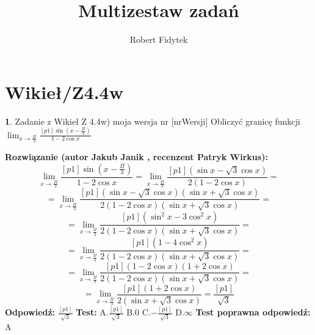 \documentclass[12pt, a4paper]{article}
\title{Multizestaw zadań}
\author{Robert Fidytek}
\date{}
\theoremstyle{definition} %
\newtheorem{zad}{}
\newcommand{\kategoria}[1]{\section{#1}} %
\newcommand{\zadStart}[1]{\begin{zad}#1\newline} %
\newcommand{\zadStop}{\end{zad}}   %
\newcommand{\rozwStart}[2]{\noindent \textbf{Rozwiązanie (autor #1 , recenzent #2): }\newline} %
\newcommand{\rozwStop}{\newline}                                            %
\newcommand{\odpStart}{\noindent \textbf{Odpowiedź:}\newline}    %
\newcommand{\odpStop}{\newline}                                             %
\newcommand{\testStart}{\noindent \textbf{Test:}\newline} %
\newcommand{\testStop}{\newline} %
\newcommand{\kluczStart}{\noindent \textbf{Test poprawna odpowiedź:}\newline} %
\newcommand{\kluczStop}{\newline} %
\begin{document}
\maketitle


\kategoria{Wikieł/Z4.4w}
\zadStart{Zadanie z Wikieł Z 4.4w) moja wersja nr [nrWersji]}
Obliczyć granicę funkcji $\lim_{x \to \frac{\Pi}{3}} \frac{[p1]\sin({x-\frac{\Pi}{3}})}{1-2\cos{x}}$
\zadStop
\rozwStart{Jakub Janik}{Patryk Wirkus}
$$\lim_{x \to \frac{\Pi}{3}} \frac{[p1]\sin({x-\frac{\Pi}{3}})}{1-2\cos{x}}=\lim_{x \to \frac{\Pi}{3}} \frac{[p1](\sin{x}-\sqrt{3}\cos{x})}{2(1-2\cos{x})}=$$
$$=\lim_{x \to \frac{\Pi}{3}} \frac{[p1](\sin{x}-\sqrt{3}\cos{x})(\sin{x}+\sqrt{3}\cos{x})}{2(1-2\cos{x})(\sin{x}+\sqrt{3}\cos{x})}=$$
$$=\lim_{x \to \frac{\Pi}{3}} \frac{[p1](\sin^2{x}-3\cos^2{x})}{2(1-2\cos{x})(\sin{x}+\sqrt{3}\cos{x})}=$$
$$=\lim_{x \to \frac{\Pi}{3}} \frac{[p1](1-4\cos^2{x})}{2(1-2\cos{x})(\sin{x}+\sqrt{3}\cos{x})}=$$
$$=\lim_{x \to \frac{\Pi}{3}} \frac{[p1](1-2\cos{x})(1+2\cos{x})}{2(1-2\cos{x})(\sin{x}+\sqrt{3}\cos{x})}=$$
$$=\lim_{x \to \frac{\Pi}{3}} \frac{[p1](1+2\cos{x})}{2(\sin{x}+\sqrt{3}\cos{x})}=\frac{[p1]}{\sqrt{3}}$$
\rozwStop
\odpStart
$\frac{[p1]}{\sqrt{3}}$
\odpStop
\testStart
A.$\frac{[p1]}{\sqrt{3}}$
B.$0$
C.$-\frac{[p1]}{\sqrt{3}}$
D.$\infty$
\testStop
\kluczStart
A
\kluczStop
\end{document}
